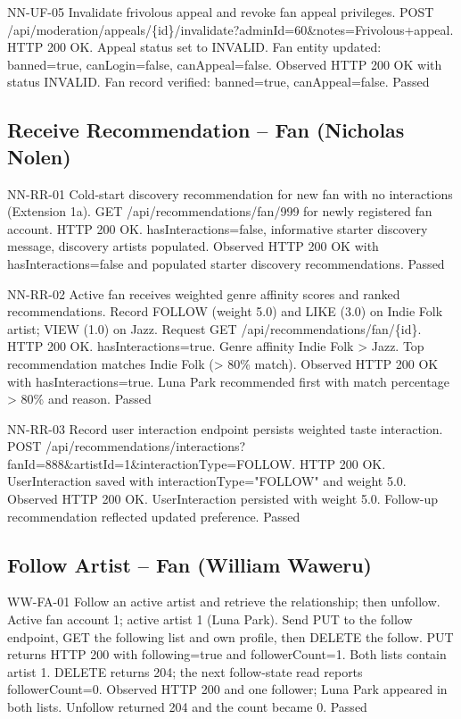 \documentclass[11pt]{report}
\begin{document}
\clearpage
\nicktestcase
{NN-UF-05}
{Invalidate frivolous appeal and revoke fan appeal privileges.}
{POST /api/moderation/appeals/\{id\}/invalidate?adminId=60\&notes=Frivolous+appeal.}
{HTTP 200 OK. Appeal status set to INVALID. Fan entity updated: banned=true, canLogin=false, canAppeal=false.}
{Observed HTTP 200 OK with status INVALID. Fan record verified: banned=true, canAppeal=false.}
{Passed}

\subsection*{Receive Recommendation -- Fan (Nicholas Nolen)}
\nicktestcase
{NN-RR-01}
{Cold-start discovery recommendation for new fan with no interactions (Extension 1a).}
{GET /api/recommendations/fan/999 for newly registered fan account.}
{HTTP 200 OK. hasInteractions=false, informative starter discovery message, discovery artists populated.}
{Observed HTTP 200 OK with hasInteractions=false and populated starter discovery recommendations.}
{Passed}

\clearpage
\nicktestcase
{NN-RR-02}
{Active fan receives weighted genre affinity scores and ranked recommendations.}
{Record FOLLOW (weight 5.0) and LIKE (3.0) on Indie Folk artist; VIEW (1.0) on Jazz. Request GET /api/recommendations/fan/\{id\}.}
{HTTP 200 OK. hasInteractions=true. Genre affinity Indie Folk > Jazz. Top recommendation matches Indie Folk (> 80\% match).}
{Observed HTTP 200 OK with hasInteractions=true. Luna Park recommended first with match percentage > 80\% and reason.}
{Passed}

\nicktestcase
{NN-RR-03}
{Record user interaction endpoint persists weighted taste interaction.}
{POST /api/recommendations/interactions?fanId=888\&artistId=1\&interactionType=FOLLOW.}
{HTTP 200 OK. UserInteraction saved with interactionType="FOLLOW" and weight 5.0.}
{Observed HTTP 200 OK. UserInteraction persisted with weight 5.0. Follow-up recommendation reflected updated preference.}
{Passed}

\clearpage
\subsection*{Follow Artist -- Fan (William Waweru)}
\williamtestcase
{WW-FA-01}
{Follow an active artist and retrieve the relationship; then unfollow.}
{Active fan account 1; active artist 1 (Luna Park). Send PUT to the follow endpoint, GET the following list and own profile, then DELETE the follow.}
{PUT returns HTTP 200 with following=true and followerCount=1. Both lists contain artist 1. DELETE returns 204; the next follow-state read reports followerCount=0.}
{Observed HTTP 200 and one follower; Luna Park appeared in both lists. Unfollow returned 204 and the count became 0.}
{Passed}
\end{document}
